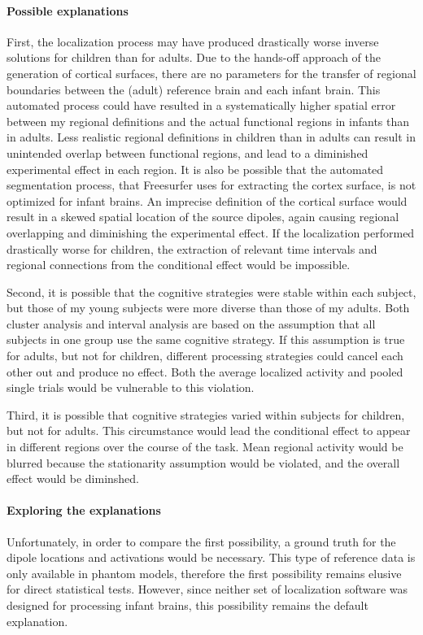 \paragraph{Possible explanations}
First, the localization process may have produced drastically worse inverse solutions for children than for adults.
Due to the hands-off approach of the generation of cortical surfaces, there are no parameters for the transfer of regional boundaries between the (adult) reference brain and each infant brain.
This automated process could have resulted in a systematically higher spatial error between my regional definitions and the actual functional regions in infants than in adults.
Less realistic regional definitions in children than in adults can result in unintended overlap between functional regions, and lead to a diminished experimental effect in each region.
It is also be possible that the automated segmentation process, that Freesurfer uses for extracting the cortex surface, is not optimized for infant brains.
An imprecise definition of the cortical surface would result in a skewed spatial location of the source dipoles, again causing regional overlapping and diminishing the experimental effect.
If the localization performed drastically worse for children, the extraction of relevant time intervals and regional connections from the conditional effect would be impossible.

Second, it is possible that the cognitive strategies were stable within each subject, but those of my young subjects were  more diverse than those of my adults.
Both cluster analysis and interval analysis are based on the assumption that all subjects in one group use the same cognitive strategy.
If this assumption is true for adults, but not for children, different processing strategies could cancel each other out and produce no effect.
Both the average localized activity and pooled single trials would be vulnerable to this violation.

Third, it is possible that cognitive strategies varied within subjects for children, but not for adults.
This circumstance would lead the conditional effect to appear in different regions over the course of the task.
Mean regional activity would be blurred because the stationarity assumption would be violated, and the overall effect would be diminshed.

\paragraph{Exploring the explanations}
Unfortunately, in order to compare the first possibility, a ground truth for the dipole locations and activations would be necessary.
This type of reference data is only available in phantom models, therefore the first possibility remains elusive for direct statistical tests.
However, since neither set of localization software was designed for processing infant brains, this possibility remains the  default explanation.

